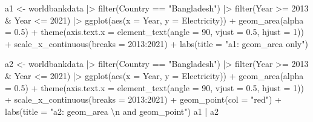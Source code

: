 \documentclass[
  letterpaper,
  DIV=11,
  numbers=noendperiod]{scrreprt}
\newenvironment{Shaded}{\begin{snugshade}}{\end{snugshade}}
\newcommand{\AttributeTok}[1]{\textcolor[rgb]{0.40,0.45,0.13}{#1}}
\newcommand{\DecValTok}[1]{\textcolor[rgb]{0.68,0.00,0.00}{#1}}
\newcommand{\FloatTok}[1]{\textcolor[rgb]{0.68,0.00,0.00}{#1}}
\newcommand{\FunctionTok}[1]{\textcolor[rgb]{0.28,0.35,0.67}{#1}}
\newcommand{\NormalTok}[1]{\textcolor[rgb]{0.00,0.23,0.31}{#1}}
\newcommand{\OtherTok}[1]{\textcolor[rgb]{0.00,0.23,0.31}{#1}}
\newcommand{\SpecialCharTok}[1]{\textcolor[rgb]{0.37,0.37,0.37}{#1}}
\newcommand{\StringTok}[1]{\textcolor[rgb]{0.13,0.47,0.30}{#1}}
\begin{document}
\begin{Shaded}
\begin{Highlighting}[]
\NormalTok{a1 }\OtherTok{\textless{}{-}}\NormalTok{ worldbankdata }\SpecialCharTok{|\textgreater{}}
  \FunctionTok{filter}\NormalTok{(Country }\SpecialCharTok{==} \StringTok{"Bangladesh"}\NormalTok{) }\SpecialCharTok{|\textgreater{}}
  \FunctionTok{filter}\NormalTok{(Year }\SpecialCharTok{\textgreater{}=} \DecValTok{2013} \SpecialCharTok{\&}\NormalTok{ Year }\SpecialCharTok{\textless{}=} \DecValTok{2021}\NormalTok{) }\SpecialCharTok{|\textgreater{}}
  \FunctionTok{ggplot}\NormalTok{(}\FunctionTok{aes}\NormalTok{(}\AttributeTok{x =}\NormalTok{ Year, }\AttributeTok{y =}\NormalTok{ Electricity)) }\SpecialCharTok{+}
  \FunctionTok{geom\_area}\NormalTok{(}\AttributeTok{alpha =} \FloatTok{0.5}\NormalTok{) }\SpecialCharTok{+}
  \FunctionTok{theme}\NormalTok{(}\AttributeTok{axis.text.x =} \FunctionTok{element\_text}\NormalTok{(}\AttributeTok{angle =} \DecValTok{90}\NormalTok{, }\AttributeTok{vjust =} \FloatTok{0.5}\NormalTok{, }\AttributeTok{hjust =} \DecValTok{1}\NormalTok{)) }\SpecialCharTok{+}
  \FunctionTok{scale\_x\_continuous}\NormalTok{(}\AttributeTok{breaks =} \DecValTok{2013}\SpecialCharTok{:}\DecValTok{2021}\NormalTok{) }\SpecialCharTok{+}
  \FunctionTok{labs}\NormalTok{(}\AttributeTok{title =} \StringTok{"a1: geom\_area only"}\NormalTok{)}

\NormalTok{a2 }\OtherTok{\textless{}{-}}\NormalTok{ worldbankdata }\SpecialCharTok{|\textgreater{}}
  \FunctionTok{filter}\NormalTok{(Country }\SpecialCharTok{==} \StringTok{"Bangladesh"}\NormalTok{) }\SpecialCharTok{|\textgreater{}}
  \FunctionTok{filter}\NormalTok{(Year }\SpecialCharTok{\textgreater{}=} \DecValTok{2013} \SpecialCharTok{\&}\NormalTok{ Year }\SpecialCharTok{\textless{}=} \DecValTok{2021}\NormalTok{) }\SpecialCharTok{|\textgreater{}}
  \FunctionTok{ggplot}\NormalTok{(}\FunctionTok{aes}\NormalTok{(}\AttributeTok{x =}\NormalTok{ Year, }\AttributeTok{y =}\NormalTok{ Electricity)) }\SpecialCharTok{+}
  \FunctionTok{geom\_area}\NormalTok{(}\AttributeTok{alpha =} \FloatTok{0.5}\NormalTok{) }\SpecialCharTok{+}
  \FunctionTok{theme}\NormalTok{(}\AttributeTok{axis.text.x =} \FunctionTok{element\_text}\NormalTok{(}\AttributeTok{angle =} \DecValTok{90}\NormalTok{, }\AttributeTok{vjust =} \FloatTok{0.5}\NormalTok{, }\AttributeTok{hjust =} \DecValTok{1}\NormalTok{)) }\SpecialCharTok{+}
  \FunctionTok{scale\_x\_continuous}\NormalTok{(}\AttributeTok{breaks =} \DecValTok{2013}\SpecialCharTok{:}\DecValTok{2021}\NormalTok{) }\SpecialCharTok{+}
  \FunctionTok{geom\_point}\NormalTok{(}\AttributeTok{col =} \StringTok{"red"}\NormalTok{) }\SpecialCharTok{+}
  \FunctionTok{labs}\NormalTok{(}\AttributeTok{title =} \StringTok{"a2: geom\_area }\SpecialCharTok{\textbackslash{}n}\StringTok{ and geom\_point"}\NormalTok{)}
\NormalTok{a1 }\SpecialCharTok{|}\NormalTok{ a2}
\end{Highlighting}
\end{Shaded}
\end{document}

